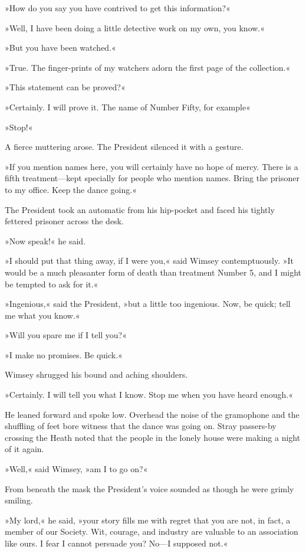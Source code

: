 »How do you say you have contrived to get this information?«

»Well, I have been doing a little detective work on my own, you know.«

»But you have been watched.«

»True. The finger-prints of my watchers adorn the first page of the collection.«

»This statement can be proved?«

»Certainly. I will prove it. The name of Number Fifty, for example\longdash«

»Stop!«

A fierce muttering arose. The President silenced it with a gesture.

»If you mention names here, you will certainly have no hope of mercy. There is a fifth treatment—kept specially for people who mention names. Bring the prisoner to my office. Keep the dance going.«

The President took an automatic from his hip-pocket and faced his tightly fettered prisoner across the desk.

»Now speak!« he said.

»I should put that thing away, if I were you,« said Wimsey contemptuously. »It would be a much pleasanter form of death than treatment Number 5, and I might be tempted to ask for it.«

»Ingenious,« said the President, »but a little too ingenious. Now, be quick; tell me what you know.«

»Will you spare me if I tell you?«

»I make no promises. Be quick.«

Wimsey shrugged his bound and aching shoulders.

»Certainly. I will tell you what I know. Stop me when you have heard enough.«

He leaned forward and spoke low. Overhead the noise of the gramophone and the shuffling of feet bore witness that the dance was going on. Stray passers-by crossing the Heath noted that the people in the lonely house were making a night of it again.

»Well,« said Wimsey, »am I to go on?«

From beneath the mask the President's voice sounded as though he were grimly smiling.

»My lord,« he said, »your story fills me with regret that you are not, in fact, a member of our Society. Wit, courage, and industry are valuable to an association like ours. I fear I cannot persuade you? No—I supposed not.«

